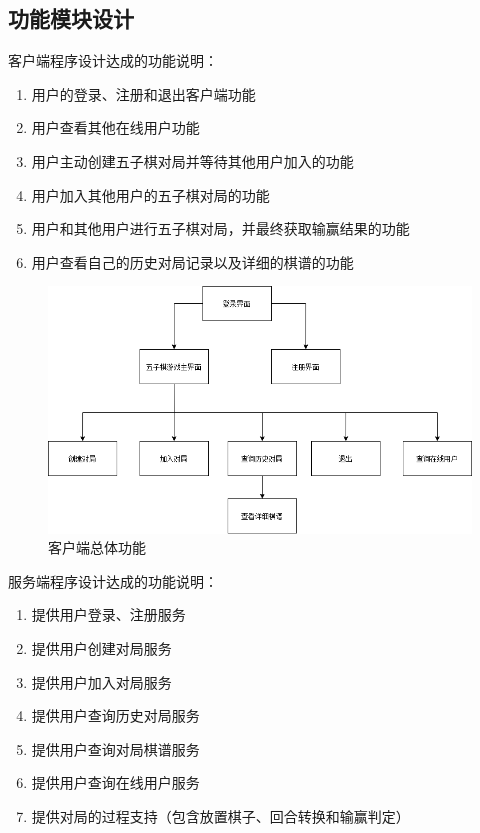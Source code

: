 \documentclass[utf8]{article}
\begin{document}
\subsection{功能模块设计}
客户端程序设计达成的功能说明：
\begin{enumerate}
    \item 用户的登录、注册和退出客户端功能
    \item 用户查看其他在线用户功能
    \item 用户主动创建五子棋对局并等待其他用户加入的功能
    \item 用户加入其他用户的五子棋对局的功能
    \item 用户和其他用户进行五子棋对局，并最终获取输赢结果的功能
    \item 用户查看自己的历史对局记录以及详细的棋谱的功能
\end{enumerate}
\begin{figure}[htbp]
    \centering
    \includegraphics[width=\textwidth]{pictures/1}
    \caption{客户端总体功能}
\end{figure}
服务端程序设计达成的功能说明：
\begin{enumerate}
    \item 提供用户登录、注册服务
    \item 提供用户创建对局服务
    \item 提供用户加入对局服务
    \item 提供用户查询历史对局服务
    \item 提供用户查询对局棋谱服务
    \item 提供用户查询在线用户服务
    \item 提供对局的过程支持（包含放置棋子、回合转换和输赢判定）
\end{enumerate}
\end{document}
